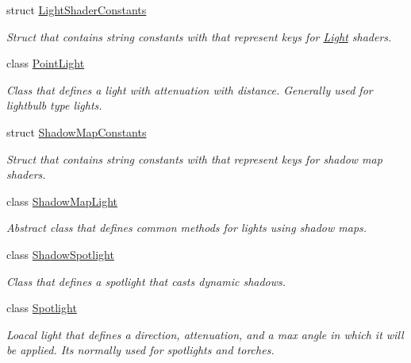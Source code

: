 \begin{DoxyCompactItemize}
struct \mbox{\hyperlink{struct_geometry_engine_1_1_geometry_world_item_1_1_geometry_light_1_1_light_shader_constants}{Light\+Shader\+Constants}}
\begin{DoxyCompactList}\small\item\em Struct that contains string constants with that represent keys for \mbox{\hyperlink{class_geometry_engine_1_1_geometry_world_item_1_1_geometry_light_1_1_light}{Light}} shaders. \end{DoxyCompactList}\item 
class \mbox{\hyperlink{class_geometry_engine_1_1_geometry_world_item_1_1_geometry_light_1_1_point_light}{Point\+Light}}
\begin{DoxyCompactList}\small\item\em Class that defines a light with attenuation with distance. Generally used for lightbulb type lights. \end{DoxyCompactList}\item 
struct \mbox{\hyperlink{struct_geometry_engine_1_1_geometry_world_item_1_1_geometry_light_1_1_shadow_map_constants}{Shadow\+Map\+Constants}}
\begin{DoxyCompactList}\small\item\em Struct that contains string constants with that represent keys for shadow map shaders. \end{DoxyCompactList}\item 
class \mbox{\hyperlink{class_geometry_engine_1_1_geometry_world_item_1_1_geometry_light_1_1_shadow_map_light}{Shadow\+Map\+Light}}
\begin{DoxyCompactList}\small\item\em Abstract class that defines common methods for lights using shadow maps. \end{DoxyCompactList}\item 
class \mbox{\hyperlink{class_geometry_engine_1_1_geometry_world_item_1_1_geometry_light_1_1_shadow_spotlight}{Shadow\+Spotlight}}
\begin{DoxyCompactList}\small\item\em Class that defines a spotlight that casts dynamic shadows. \end{DoxyCompactList}\item 
class \mbox{\hyperlink{class_geometry_engine_1_1_geometry_world_item_1_1_geometry_light_1_1_spotlight}{Spotlight}}
\begin{DoxyCompactList}\small\item\em Loacal light that defines a direction, attenuation, and a max angle in which it will be applied. It\textquotesingle{}s normally used for spotlights and torches. \end{DoxyCompactList}\item 

\end{DoxyCompactItemize}
